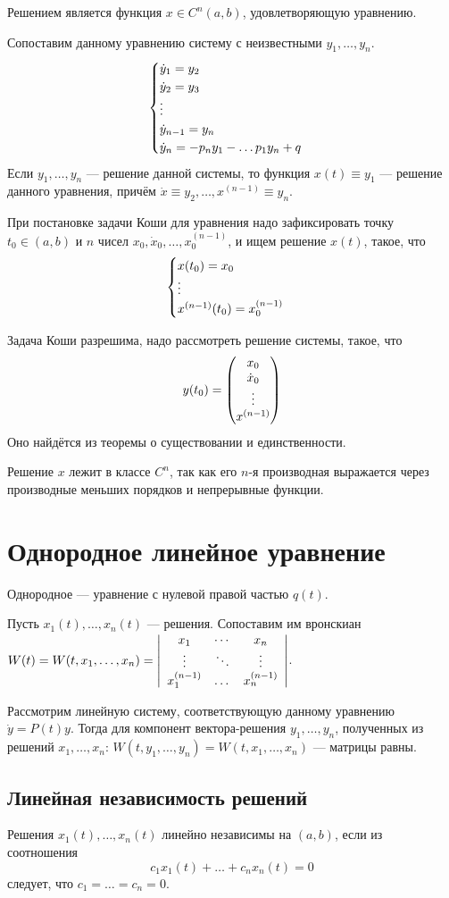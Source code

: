 \documentclass[a4paper]{report}
\begin{document}
    Решением является функция $x \in C^n(a, b)$, удовлетворяющую уравнению.

    Сопоставим данному уравнению систему с неизвестными $y_1, \dots, y_n$.
    \[\all{\dot{y}_1 = y_2 \\\dot{y}_2 = y_3 \\ \vdots \\ \dot{y}_{n - 1} = y_n \\ \dot{y}_n = -p_n y_1 - \dots p_1 y_n + q}\]
    Если $y_1, \dots, y_n$ --- решение данной системы, то функция $x(t) \equiv y_1$ --- решение данного уравнения, причём $\dot{x} \equiv y_2, \dots, x^{(n - 1)} \equiv y_{n}$.

    При постановке задачи Коши для уравнения надо зафиксировать точку $t_0 \in (a, b)$ и $n$ чисел $x_0, \dot{x}_0, \dots, x^{(n - 1)}_0$, и ищем решение $x(t)$, такое, что
    \[\all{x(t_0) = x_0 \\ \vdots \\ x^{(n - 1)}(t_0) = x_0^{(n - 1)}}\]

    Задача Коши разрешима, надо рассмотреть решение системы, такое, что
    \[y(t_0) = \vect{x_0 \\ \dot{x}_0 \\ \vdots \\ x^{(n - 1)}}\]
    Оно найдётся из теоремы о существовании и единственности.

    Решение $x$ лежит в классе $C^n$, так как его $n$-я производная выражается через производные меньших порядков и непрерывные функции.
    \section{Однородное линейное уравнение}
    Однородное --- уравнение с нулевой правой частью $q(t)$.


    Пусть $x_1(t), \dots, x_n(t)$ --- решения.
    Сопоставим им вронскиан $W(t) = W(t, x_1, \dots, x_n) = \abs{\arr{ccc}{x_1 & \cdots & x_n \\ \vdots & \ddots & \vdots \\ x_1^{(n - 1)} & \dots & x_n^{(n - 1)}}}$.

    Рассмотрим линейную систему, соответствующую данному уравнению $\dot{y} = P(t)y$.
    Тогда для компонент вектора-решения $y_1, \dots, y_n$, полученных из решений $x_1, \dots, x_n$: $W(t, y_1, \dots, y_n) = W(t, x_1, \dots, x_n)$ --- матрицы равны.
    \subsection{Линейная независимость решений}
    Решения $x_1(t), \dots, x_n(t)$ линейно независимы на $(a, b)$, если из соотношения
    \[c_1 x_1(t) + \dots + c_n x_n(t) = 0\]
    следует, что $c_1 = \dots = c_n = 0$.
\end{document}
